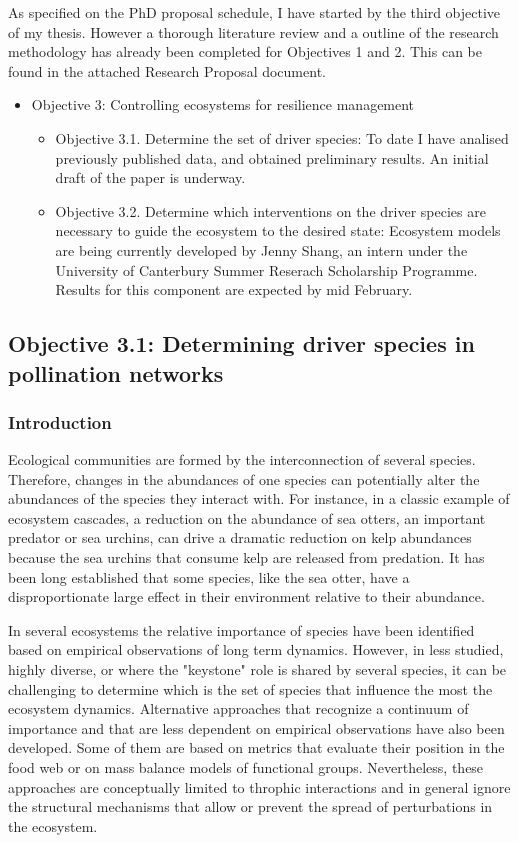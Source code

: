 \documentclass[a4paper]{article}
\begin{document}
As specified on the PhD proposal schedule, I have started by the third objective of my thesis. However a thorough literature review and a outline of the research methodology has already been completed for Objectives 1 and 2. This can be found in the attached Research Proposal document. 

\begin{itemize}
	\item Objective 3: Controlling ecosystems for resilience management
	\begin{itemize}
		\item Objective 3.1. Determine the set of driver species: To date I have analised previously published data, and obtained preliminary results. An initial draft of the paper is underway. 
		\item Objective 3.2. Determine which interventions on the driver species are necessary to guide the ecosystem to the desired state: Ecosystem models are being currently developed by Jenny Shang, an intern under the University of Canterbury Summer Reserach Scholarship Programme. Results for this component are expected by mid February.
	\end{itemize}
\end{itemize}

\subsection*{Objective 3.1: Determining driver species in pollination networks}
 
\subsubsection*{Introduction}

Ecological communities are formed by the interconnection of several species. Therefore, changes in the abundances of one species can potentially alter the abundances of the species they interact with. For instance, in a classic example of ecosystem cascades, a reduction on the abundance of sea otters, an important predator or sea urchins, can drive a dramatic reduction on kelp abundances because the sea urchins that consume kelp are released from predation. It has been long established that some species, like the sea otter, have a disproportionate large effect in their environment relative to their abundance. 

In several ecosystems the relative importance of species have been identified based on empirical observations of long term dynamics. However, in less studied, highly diverse, or where the "keystone" role is shared by several species, it can be challenging to determine which is the set of species that influence the most the ecosystem dynamics. Alternative approaches that recognize a continuum of importance and that are less dependent on empirical observations have also been developed. Some of them are based on metrics that evaluate their position in the food web or on mass balance models of functional groups. Nevertheless, these approaches are conceptually limited to throphic interactions and in general ignore the structural mechanisms that allow or prevent the spread of perturbations in the ecosystem.
\end{document}
